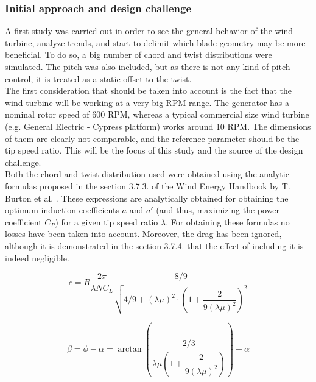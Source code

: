 \documentclass[../TFG_Report.tex]{subfiles}
\begin{document}
\subsubsection{Initial approach and design challenge}\label{sec:design_challenge}

A first study was carried out in order to see the general behavior of the wind turbine, analyze trends, and start to delimit which blade geometry may be more beneficial. To do so, a big number of chord and twist distributions were simulated. The pitch was also included, but as there is not any kind of pitch control, it is treated as a static offset to the twist. \\

The first consideration that should be taken into account is the fact that the wind turbine will be working at a very big RPM range. The generator has a nominal rotor speed of 600 RPM, whereas a typical commercial size wind turbine (e.g. General Electric - Cypress platform) works around 10 RPM. The dimensions of them are clearly not comparable, and the reference parameter should be the tip speed ratio. This will be the focus of this study and the source of the design challenge. \\

Both the chord and twist distribution used were obtained using the analytic formulas proposed in the section 3.7.3. of the Wind Energy Handbook by T. Burton et al. \cite{Handbook}. These expressions are analytically obtained for obtaining the optimum induction coefficients $a$ and $a'$ (and thus, maximizing the power coefficient $C_P$) for a given tip speed ratio $\lambda$. For obtaining these formulas no losses have been taken into account. Moreover, the drag has been ignored, although it is demonstrated in the section 3.7.4. that the effect of including it is indeed negligible.   %

\begin{equation}\label{OptimalChord}
c = R \dfrac{2 \pi}{\lambda N C_L} \dfrac{8/9}{\sqrt{4/9+(\lambda \mu)^2  \cdot \left( 1+\dfrac{2}{9 (\lambda \mu)^2 } \right)^2 }}
\end{equation}

\begin{equation}\label{OptimalTwist}
\beta = \phi - \alpha = \arctan{\left(   \dfrac{2/3}{\lambda \mu \left( 1+\dfrac{2}{9 (\lambda \mu)^2}   \right)}   \right)} -\alpha
\end{equation}
\end{document}
